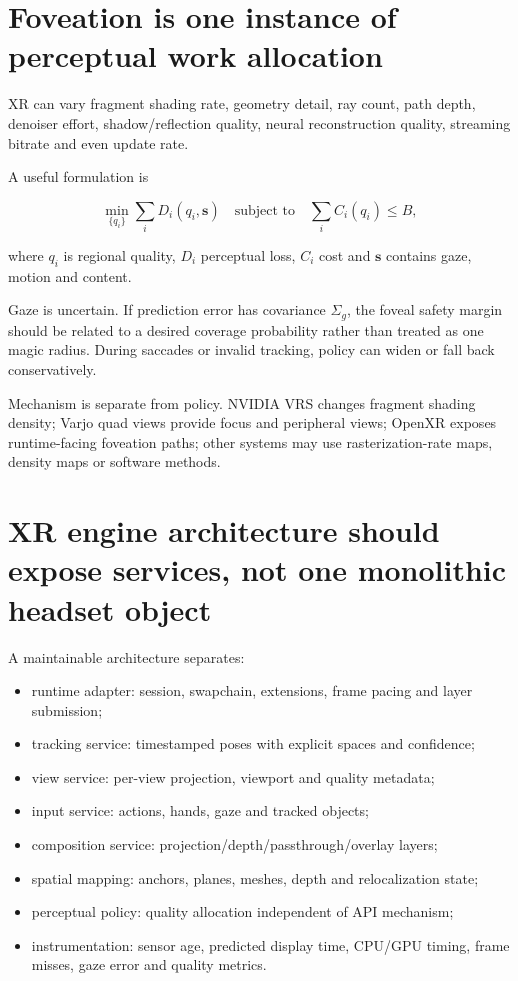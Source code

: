 \section{Foveation is one instance of perceptual work allocation}\label{04-visual-computing-ii-ch035-foveation-is-one-instance-of-perceptual-work-allocation}

XR can vary fragment shading rate, geometry detail, ray count, path depth, denoiser effort, shadow/reflection quality, neural reconstruction quality, streaming bitrate and even update rate.

A useful formulation is

\[
\min_{\{q_i\}}\sum_i D_i(q_i,\mathbf{s})
\quad\text{subject to}\quad
\sum_i C_i(q_i)\le B,
\]

where \(q_i\) is regional quality, \(D_i\) perceptual loss, \(C_i\) cost and \(\mathbf s\) contains gaze, motion and content.

Gaze is uncertain. If prediction error has covariance \(\Sigma_g\), the foveal safety margin should be related to a desired coverage probability rather than treated as one magic radius. During saccades or invalid tracking, policy can widen or fall back conservatively.

Mechanism is separate from policy. NVIDIA VRS changes fragment shading density; Varjo quad views provide focus and peripheral views; OpenXR exposes runtime-facing foveation paths; other systems may use rasterization-rate maps, density maps or software methods.

\section{XR engine architecture should expose services, not one monolithic headset object}\label{04-visual-computing-ii-ch035-xr-engine-architecture-should-expose-services-not-one-monolithic-headset-object}

A maintainable architecture separates:

\begin{itemize}
\tightlist
\item
  runtime adapter: session, swapchain, extensions, frame pacing and layer submission;
\item
  tracking service: timestamped poses with explicit spaces and confidence;
\item
  view service: per-view projection, viewport and quality metadata;
\item
  input service: actions, hands, gaze and tracked objects;
\item
  composition service: projection/depth/passthrough/overlay layers;
\item
  spatial mapping: anchors, planes, meshes, depth and relocalization state;
\item
  perceptual policy: quality allocation independent of API mechanism;
\item
  instrumentation: sensor age, predicted display time, CPU/GPU timing, frame misses, gaze error and quality metrics.
\end{itemize}

